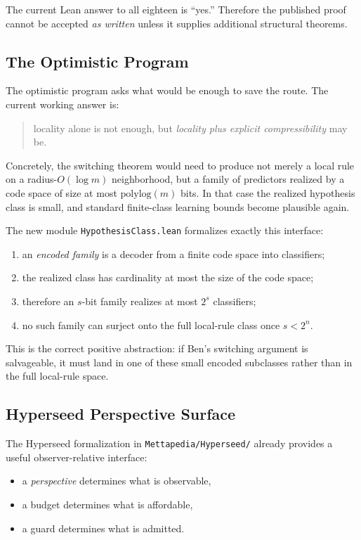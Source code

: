 \documentclass[11pt]{article}
\theoremstyle{remark}
\begin{document}
The current Lean answer to all eighteen is ``yes.''  Therefore the published proof cannot be
accepted \emph{as written} unless it supplies additional structural theorems.

\subsection{The Optimistic Program}

The optimistic program asks what would be enough to save the route.
The current working answer is:
\begin{quote}
locality alone is not enough, but \emph{locality plus explicit compressibility} may be.
\end{quote}

Concretely, the switching theorem would need to produce not merely a local rule on a
radius-$O(\log m)$ neighborhood, but a family of predictors realized by a code space of
size at most \(\mathrm{polylog}(m)\) bits.  In that case the realized hypothesis class is
small, and standard finite-class learning bounds become plausible again.

The new module \texttt{HypothesisClass.lean} formalizes exactly this interface:
\begin{enumerate}[leftmargin=1.5em]
  \item an \emph{encoded family} is a decoder from a finite code space into classifiers;
  \item the realized class has cardinality at most the size of the code space;
  \item therefore an $s$-bit family realizes at most $2^s$ classifiers;
  \item no such family can surject onto the full local-rule class once $s < 2^n$.
\end{enumerate}

This is the correct positive abstraction: if Ben's switching argument is salvageable, it must
land in one of these small encoded subclasses rather than in the full local-rule space.

\subsection{Hyperseed Perspective Surface}

The Hyperseed formalization in \texttt{Mettapedia/Hyperseed/} already provides a useful
observer-relative interface:
\begin{itemize}[leftmargin=1.5em]
  \item a \emph{perspective} determines what is observable,
  \item a budget determines what is affordable,
  \item a guard determines what is admitted.
\end{itemize}
\end{document}
